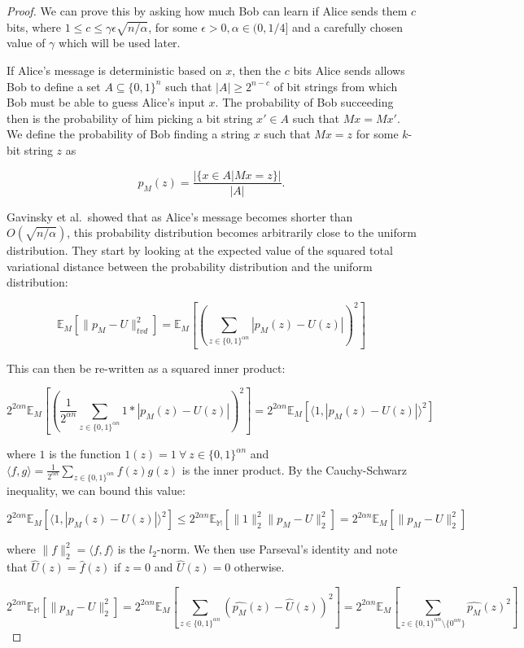 \documentclass[a4paper]{article}
\begin{document}
        \begin{proof}
        We can prove this by asking how much Bob can learn if Alice sends them $c$ bits, where $1 \leq c \leq \gamma \epsilon\sqrt{n/\alpha}$, for some $\epsilon > 0, \alpha \in (0,1/4]$ and a carefully chosen value of $\gamma$ which will be used later.

        If Alice's message is deterministic based on $x$, then the $c$ bits Alice sends allows Bob to define a set $A \subseteq \{0, 1\}^n$ such that $|A| \geq 2^{n-c}$ of bit strings from which Bob must be able to guess Alice's input $x$. The probability of Bob succeeding then is the probability of him picking a bit string $x' \in A$ such that $Mx = Mx'$. We define the probability of Bob finding a string $x$ such that $Mx = z$ for some $k$-bit string $z$ as

        $$p_M(z) = \frac{|\{x \in A|Mx = z\}|}{|A|}.$$

        Gavinsky et al.~showed that as Alice's message becomes shorter than $O(\sqrt{n/\alpha})$, this probability distribution becomes arbitrarily close to the uniform distribution. They start by looking at the expected value of the squared total variational distance between the probability distribution and the uniform distribution:

        $$\mathbb{E}_M[\|p_M - U\|_{tvd}^2] = \mathbb{E}_M[(\sum_{z \in \{0, 1\}^{\alpha n}}|p_M(z) - U(z)|)^2]$$

        This can then be re-written as a squared inner product:

        $$2^{2\alpha n}\mathbb{E}_M\left[\left(\frac{1}{2^{\alpha n}}\sum_{z \in \{0, 1\}^{\alpha n}}1 * |p_M(z) - U(z)|\right)^2\right] = 2^{2\alpha n}\mathbb{E}_M[\langle 1, |p_M(z) - U(z)|\rangle^2]$$

        where $1$ is the function $1(z) = 1~\forall~z\in\{0, 1\}^{\alpha n}$ and $\langle f, g\rangle = \frac{1}{2^{\alpha n}}\sum_{z \in \{0, 1\}^{\alpha n}}f(z)g(z)$ is the inner product. By the Cauchy-Schwarz inequality, we can bound this value:

        $$2^{2\alpha n}\mathbb{E}_M[\langle 1, |p_M(z) - U(z)|\rangle^2] \leq 2^{2\alpha n}\mathbb{E_M}[\|1\|_2^2\|p_M - U\|_2^2] = 2^{2\alpha n}\mathbb{E}_M[\|p_M - U\|_2^2]$$

        where $\|f\|_2^2 = \langle f, f\rangle$ is the $l_2$-norm. We then use Parseval's identity and note that $\widehat{U}(z) = \widehat{f}(z)$ if $z = 0$ and $\widehat{U}(z) = 0$ otherwise.

        $$2^{2\alpha n}\mathbb{E_M}[\|p_M - U\|_2^2] = 2^{2\alpha n}\mathbb{E}_M\left[\sum_{z \in \{0, 1\}^{\alpha n}}(\widehat{p_M}(z) - \widehat{U}(z))^2\right] = 2^{2\alpha n}\mathbb{E}_M\left[\sum_{z \in \{0, 1\}^{\alpha n}\setminus\{0^{\alpha n}\}}\widehat{p_M}(z)^2\right]$$


\end{proof}
\end{document}
